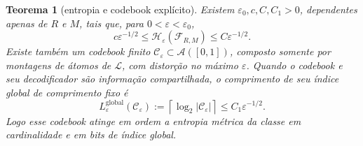 \documentclass[11pt,a4paper]{article}
\newtheorem{theorem}{Teorema}[section]
\theoremstyle{definition}
\theoremstyle{remark}
\newcommand{\Aclass}{\mathcal{A}}
\newcommand{\Library}{\mathcal{L}}
\begin{document}
\begin{theorem}[entropia e codebook explícito]\label{thm:entropy}
Existem $\varepsilon_0,c,C,C_1>0$, dependentes apenas de $R$ e $M$, tais que, para $0<\varepsilon<\varepsilon_0$,
\begin{equation}
 c\varepsilon^{-1/2}
 \le\mathcal{H}_\varepsilon(\mathcal{F}_{R,M})
 \le C\varepsilon^{-1/2}.
 \label{eq:entropy-order}
\end{equation}
Existe também um codebook finito $\mathcal{C}_\varepsilon\subset\Aclass([0,1])$, composto somente por montagens de átomos de $\Library$, com distorção no máximo $\varepsilon$. Quando o codebook e seu decodificador são informação compartilhada, o comprimento de seu índice global de comprimento fixo é
\begin{equation}
 L_\varepsilon^{\mathrm{global}}(\mathcal C_\varepsilon)
 :=\left\lceil\log_2|\mathcal{C}_\varepsilon|\right\rceil
 \le C_1\varepsilon^{-1/2}.
 \label{eq:code-length}
\end{equation}
Logo esse codebook atinge em ordem a entropia métrica da classe em cardinalidade e em bits de índice global.
\end{theorem}
\end{document}
